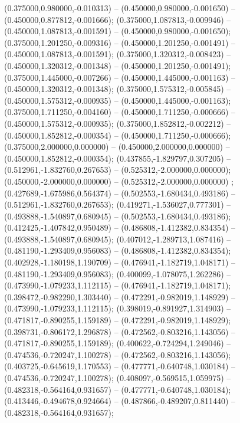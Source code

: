  (0.375000,0.980000,-0.010313) -- (0.450000,0.980000,-0.001650) -- (0.450000,0.877812,-0.001666);
 (0.375000,1.087813,-0.009946) -- (0.450000,1.087813,-0.001591) -- (0.450000,0.980000,-0.001650);
 (0.375000,1.201250,-0.009316) -- (0.450000,1.201250,-0.001491) -- (0.450000,1.087813,-0.001591);
 (0.375000,1.320312,-0.008423) -- (0.450000,1.320312,-0.001348) -- (0.450000,1.201250,-0.001491);
 (0.375000,1.445000,-0.007266) -- (0.450000,1.445000,-0.001163) -- (0.450000,1.320312,-0.001348);
 (0.375000,1.575312,-0.005845) -- (0.450000,1.575312,-0.000935) -- (0.450000,1.445000,-0.001163);
 (0.375000,1.711250,-0.004160) -- (0.450000,1.711250,-0.000666) -- (0.450000,1.575312,-0.000935);
 (0.375000,1.852812,-0.002212) -- (0.450000,1.852812,-0.000354) -- (0.450000,1.711250,-0.000666);
 (0.375000,2.000000,0.000000) -- (0.450000,2.000000,0.000000) -- (0.450000,1.852812,-0.000354);
 (0.437855,-1.829797,0.307205) -- (0.512961,-1.832760,0.267653) -- (0.525312,-2.000000,0.000000);
 (0.450000,-2.000000,0.000000) -- (0.525312,-2.000000,0.000000) ;
 (0.427689,-1.675986,0.564374) -- (0.502553,-1.680434,0.493186) -- (0.512961,-1.832760,0.267653);
 (0.419271,-1.536027,0.777301) -- (0.493888,-1.540897,0.680945) -- (0.502553,-1.680434,0.493186);
 (0.412425,-1.407842,0.950489) -- (0.486808,-1.412382,0.834354) -- (0.493888,-1.540897,0.680945);
 (0.407012,-1.289713,1.087416) -- (0.481190,-1.293409,0.956083) -- (0.486808,-1.412382,0.834354);
 (0.402928,-1.180198,1.190709) -- (0.476941,-1.182719,1.048171) -- (0.481190,-1.293409,0.956083);
 (0.400099,-1.078075,1.262286) -- (0.473990,-1.079233,1.112115) -- (0.476941,-1.182719,1.048171);
 (0.398472,-0.982290,1.303440) -- (0.472291,-0.982019,1.148929) -- (0.473990,-1.079233,1.112115);
 (0.398019,-0.891927,1.314903) -- (0.471817,-0.890255,1.159189) -- (0.472291,-0.982019,1.148929);
 (0.398731,-0.806172,1.296878) -- (0.472562,-0.803216,1.143056) -- (0.471817,-0.890255,1.159189);
 (0.400622,-0.724294,1.249046) -- (0.474536,-0.720247,1.100278) -- (0.472562,-0.803216,1.143056);
 (0.403725,-0.645619,1.170553) -- (0.477771,-0.640748,1.030184) -- (0.474536,-0.720247,1.100278);
 (0.408097,-0.569515,1.059975) -- (0.482318,-0.564164,0.931657) -- (0.477771,-0.640748,1.030184);
 (0.413446,-0.494678,0.924664) -- (0.487866,-0.489207,0.811440) -- (0.482318,-0.564164,0.931657);
